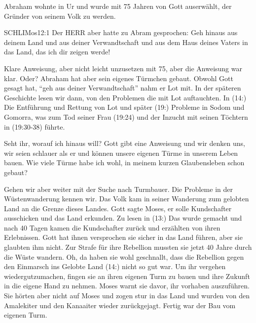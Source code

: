\documentclass[fontsize=16pt]{mybib}
\begin{document}
\begin{otsblock}
    Abraham wohnte in Ur und wurde mit 75 Jahren von Gott auserwählt, der Gründer von seinem Volk zu werden. 
    \begin{bibelbox}{SCHL}{IMos}{12:1}
        Der HERR aber hatte zu Abram gesprochen: Geh hinaus aus deinem Land und aus deiner Verwandtschaft und aus dem Haus deines Vaters in das Land, das ich dir zeigen werde!
    \end{bibelbox} 

    Klare Anweisung, aber nicht leicht unzusetzen mit 75, aber die Anweisung war klar. Oder? Abraham hat aber sein eigenes Türmchen gebaut. Obwohl Gott gesagt hat, \enquote{geh aus deiner Verwandtschaft} nahm er Lot mit. In der späteren Geschichte lesen wir dann, von den Problemen die mit Lot auftauchten. In (14:) Die Entführung und Rettung von Lot und später (19:) Probleme in Sodom und Gomorra, was zum Tod seiner Frau (19:24) und der Inzucht mit seinen Töchtern in (19:30-38) führte.
\end{otsblock}
\begin{otsblock}
    Seht ihr, worauf ich hinaus will? Gott gibt eine Anweisung und wir denken uns, wir seien schlauer als er und können unsere eigenen Türme in unserem Leben bauen. Wie viele Türme habe ich wohl, in meinem kurzen Glaubensleben schon gebaut?
\end{otsblock}
\begin{otsblock}
    Gehen wir aber weiter mit der Suche nach Turmbauer. Die Probleme in der Wüstenwanderung kennen wir. Das Volk kam in seiner Wanderung zum gelobten Land an die Grenze dieses Landes. Gott sagte Moses, er solle Kundschafter ausschicken und das Land erkunden. Zu lesen in (13:) Das wurde gemacht und nach 40 Tagen kamen die Kundschafter zurück und erzählten von ihren Erlebnissen. Gott hat ihnen versprochen sie sicher in das Land führen, aber sie glaubten ihm nicht. Zur Strafe für ihre Rebellion mussten sie jetzt 40 Jahre durch die Wüste wandern. Oh, da haben sie wohl geschnallt, dass die Rebellion gegen den Einmarsch ins Gelobte Land (14:) nicht so gut war. Um ihr vergehen wiedergutzumachen, fingen sie an ihren eigenen Turm zu bauen und ihre Zukunft in die eigene Hand zu nehmen. Moses warnt sie davor, ihr vorhaben auszuführen. Sie hörten aber nicht auf Moses und zogen stur in das Land und wurden von den Amalekiter und den Kanaaiter wieder zurückgejagt. Fertig war der Bau vom eigenen Turm.
\end{otsblock}
\end{document}
